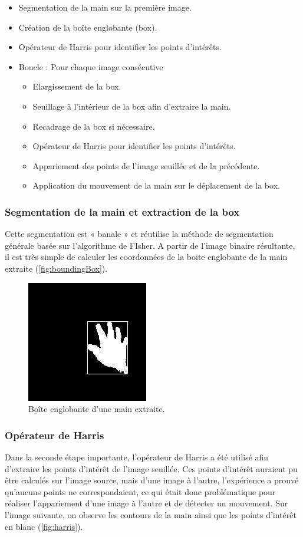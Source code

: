\begin{itemize}
\item Segmentation de la main sur la première image.
\item Création de la boîte englobante (box).
\item Opérateur de Harris pour identifier les points d’intérêts.
\item Boucle : Pour chaque image consécutive
\begin{itemize}
\item Elargissement de la box.
\item Seuillage à l’intérieur de la box afin d’extraire la main.
\item Recadrage de la box si nécessaire.
\item Opérateur de Harris pour identifier les points d’intérêts.
\item Appariement des points de l’image seuillée et de la précédente.
\item Application du mouvement de la main sur le déplacement de la box.
\end{itemize}
\end{itemize}

\subsubsection{Segmentation de la main et extraction de la box}
Cette segmentation est « banale » et réutilise la méthode de segmentation générale basée sur l’algorithme de FIsher. A partir de l’image binaire résultante, il est très simple de calculer les coordonnées de la boite englobante de la main extraite (\autoref{fig:boundingBox}).

\begin{figure}[htb!]
\centerline{\includegraphics{boundingBox.jpg}}
\caption{Boîte englobante d'une main extraite.}
\label{fig:boundingBox}
\end{figure}

\subsubsection{Opérateur de Harris}
Dans la seconde étape importante, l’opérateur de Harris a été utilisé afin d’extraire les points d’intérêt de l’image seuillée. Ces points d’intérêt auraient pu être calculés sur l’image source, mais d’une image à l’autre, l’expérience a prouvé qu’aucuns points ne correspondaient, ce qui était donc problématique pour réaliser l’appariement d’une image à l’autre et de détecter un mouvement. Sur l’image suivante, on observe les contours de la main ainsi que les points d’intérêt en blanc (\autoref{fig:harris}).

